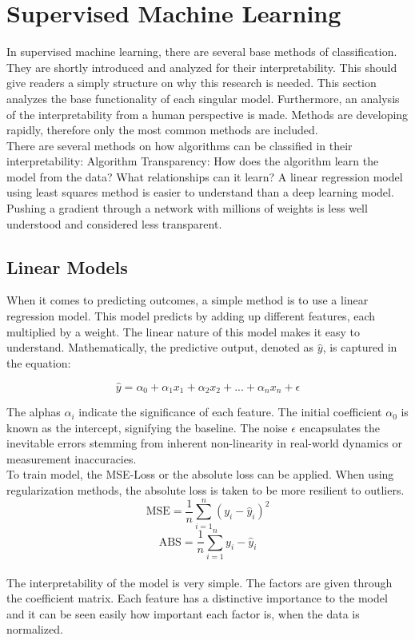 \section{Supervised Machine Learning}

In supervised machine learning, there are several base methods of classification. They are shortly introduced and analyzed for their interpretability. This should give readers a simply structure on why this research is needed. This section analyzes the base functionality of each singular model. Furthermore, an analysis of the interpretability from a human perspective is made. Methods are developing rapidly, therefore only the most common methods are included.
\\
There are several methods on how algorithms can be classified in their interpretability: Algorithm Transparency: How does the algorithm learn the model from the data? What relationships can it learn? \cite{molnar2022} A linear regression model using least squares method is easier to understand than a deep learning model. Pushing a gradient through a network with millions of weights is less well understood and considered less transparent.

\subsection{Linear Models}
When it comes to predicting outcomes, a simple method is to use a linear regression model. This model predicts by adding up different features, each multiplied by a weight. The linear nature of this model makes it easy to understand. Mathematically, the predictive output, denoted as $\hat{y}$, is  captured in the equation:

$$ \hat{y}= \alpha_0 + \alpha_1 x_1 + \alpha_2 x_2 +... +\alpha_n x_{n} + \epsilon$$

The alphas $\alpha_i$ indicate the significance of each feature. The initial coefficient $\alpha_0$ is known as the intercept, signifying the baseline.  The noise $\epsilon$ encapsulates the inevitable errors stemming from inherent non-linearity in real-world dynamics or measurement inaccuracies.
\\
To train model, the MSE-Loss or the absolute loss can be applied. When using regularization methods, the absolute loss is taken to be more resilient to outliers.
$$ \text{MSE} = \frac{1}{n} \sum_{i=1}^{n} (y_i - \hat{y}_i)^2$$
$$ \text{ABS} = \frac{1}{n} \sum_{i=1}^{n} y_i - \hat{y}_i$$
\\
The interpretability of the model is very simple. The factors are given through the coefficient matrix. Each feature has a distinctive importance to the model and it can be seen easily how important each factor is, when the data is normalized. 


